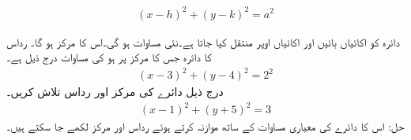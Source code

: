 \begin{mdframed}[frametitle={رداس $a$ کا دائرہ جس کا مرکز $(h,k)$ ہو کی معیاری مساوات}]
\begin{align}
(x-h)^2+(y-k)^2=a^2
\end{align}
\end{mdframed}

دائرہ  کو  اکائیاں بائیں اور  اکائیاں اوپر منتقل کیا جاتا ہے۔نئی مساوات  ہو گی۔اس کا مرکز  ہو گا۔
رداس  کا دائرہ جس کا مرکز   پر ہو کی مساوات درج ذیل ہے۔
\begin{align*}
(x-3)^2+(y-4)^2=2^2
\end{align*}
درج ذیل دائرے کی مرکز  اور رداس تلاش کریں۔
\begin{align*}
(x-1)^2+(y+5)^2=3
\end{align*}
حل:\quad
اس کا دائرے کی معیاری مساوات کے ساتھ موازنہ کرتے ہوئے رداس  اور مرکز  لکھے جا سکتے ہیں۔  

